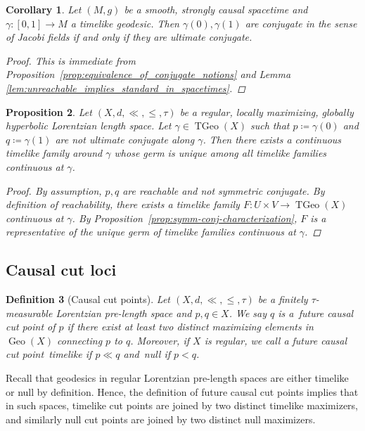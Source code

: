 \documentclass[a4paper,11pt]{article}
\numberwithin{equation}{section}
\theoremstyle{plain}
\newtheorem{Definition}{Definition}[section]
\newtheorem{Proposition}[Definition]{Proposition}
\newtheorem{Corollary}[Definition]{Corollary}
\theoremstyle{definition}
\DeclareMathOperator{\Geo}{Geo}
\DeclareMathOperator{\TGeo}{TGeo}
\begin{document}
\begin{Corollary}
Let $(M,g)$ be a smooth, strongly causal spacetime and $\gamma \colon [0,1] \to M$ a timelike geodesic. Then $\gamma(0),\gamma(1)$ are conjugate in the sense of Jacobi fields if and only if they are ultimate conjugate.
\begin{proof} This is immediate from Proposition~\ref{prop:equivalence_of_conjugate_notions} and Lemma 
\ref{lem:unreachable_implies_standard_in_spacetimes}.
\end{proof}
\end{Corollary}

\begin{Proposition}
    Let $(X,d,\ll,\leq,\tau)$ be a regular, locally maximizing, globally hyperbolic Lorentzian length space. Let $\gamma \in \TGeo(X)$ such that $p \coloneqq \gamma(0)$ and $q \coloneqq \gamma(1)$ are not ultimate conjugate along $\gamma$. Then there exists a continuous timelike family around $\gamma$ whose germ is unique among all timelike families continuous at $\gamma$.
    \begin{proof}
        By assumption, $p,q$ are reachable and not symmetric conjugate. By definition of reachability, there exists a timelike family $F \colon U \times V \to \TGeo(X)$ continuous at $\gamma$. By Proposition~\ref{prop:symm-conj-characterization}, $F$ is a representative of the unique germ of timelike families continuous at $\gamma$.
    \end{proof}
\end{Proposition}


\subsection{Causal cut loci}
\label{Subsection: causalcutloci}

\begin{Definition}[Causal cut points]
Let $(X,d,\ll,\leq,\tau)$ be a finitely $\tau$-measurable Lorentzian pre-length space and $p,q \in X$. We say $q$ is a~\emph{future causal cut point\/} of $p$ if there exist at least two distinct maximizing elements in $\Geo(X)$ connecting $p$ to $q$. Moreover, if $X$ is regular, we call a future causal cut point~\emph{timelike\/} if $p \ll q$ and~\emph{null\/} if $p < q$.
\end{Definition}

Recall that geodesics in regular Lorentzian pre-length spaces are either timelike or null by definition. Hence, the definition of future causal cut points implies that in such spaces, timelike cut points are joined by two distinct timelike maximizers, and similarly null cut points are joined by two distinct null maximizers.
\end{document}
